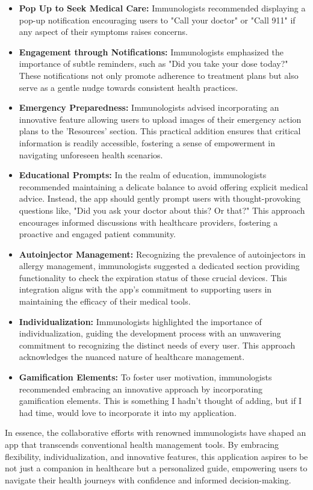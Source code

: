 \begin{itemize}
    \item \textbf{Pop Up to Seek Medical Care: }Immunologists recommended displaying a pop-up notification encouraging users to "Call your doctor" or "Call 911" if any aspect of their symptoms raises concerns.
    \item \textbf{Engagement through Notifications: }Immunologists emphasized the importance of subtle reminders, such as "Did you take your dose today?" These notifications not only promote adherence to treatment plans but also serve as a gentle nudge towards consistent health practices.
    \item \textbf{Emergency Preparedness: }Immunologists advised incorporating an innovative feature allowing users to upload images of their emergency action plans to the 'Resources' section. This practical addition ensures that critical information is readily accessible, fostering a sense of empowerment in navigating unforeseen health scenarios.
    \item \textbf{Educational Prompts:} In the realm of education, immunologists recommended maintaining a delicate balance to avoid offering explicit medical advice. Instead, the app should gently prompt users with thought-provoking questions like, "Did you ask your doctor about this? Or that?" This approach encourages informed discussions with healthcare providers, fostering a proactive and engaged patient community.
    \item \textbf{Autoinjector Management: }Recognizing the prevalence of autoinjectors in allergy management, immunologists suggested a dedicated section providing functionality to check the expiration status of these crucial devices. This integration aligns with the app's commitment to supporting users in maintaining the efficacy of their medical tools.
    \item \textbf{Individualization: }Immunologists highlighted the importance of individualization, guiding the development process with an unwavering commitment to recognizing the distinct needs of every user. This approach acknowledges the nuanced nature of healthcare management.
    \item \textbf{Gamification Elements: }To foster user motivation, immunologists recommended embracing an innovative approach by incorporating gamification elements. This is something I hadn't thought of adding, but if I had time, would love to incorporate it into my application.
\end{itemize}

In essence, the collaborative efforts with renowned immunologists have shaped an app that transcends conventional health management tools. By embracing flexibility, individualization, and innovative features, this application aspires to be not just a companion in healthcare but a personalized guide, empowering users to navigate their health journeys with confidence and informed decision-making.